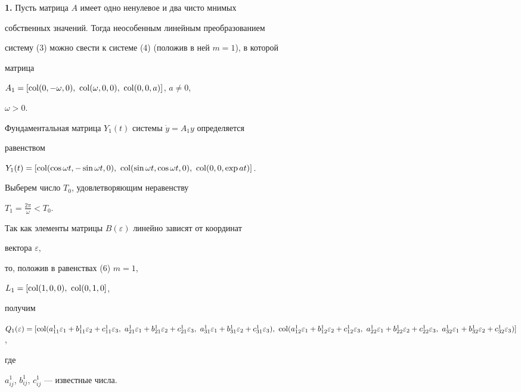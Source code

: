  


{\bf 1.} Пусть матрица $A$ имеет одно ненулевое и два чисто мнимых 


собственных значений. Тогда неособенным линейным преобразованием 


систему (3) можно свести к системе (4) (положив в ней $m=1$), в которой 


матрица 


$A_1=[\col(0,-\omega,0),\ \col(\omega,0,0),\ \col(0,0,a)]$, $a\ne 0$, 


$\omega>0$. 


Фундаментальная матрица $Y_1(t)$ системы $\Dot y=A_1y$ определяется 


равенством 


$Y_1(t)=[\col(\cos\omega t,-\sin\omega t,0),\ \col(\sin\omega t,\cos 


\omega t,0),\ \col(0,0,\exp at)]$. 


 


Выберем число $T_0$, удовлетворяющим неравенству 


$T_1=\frac{2\pi}{\omega}<T_0$. 


Так как элементы матрицы $B(\varepsilon)$ линейно зависят от координат 


вектора $\varepsilon$, 


то, положив в равенствах (6) $m=1$, 


$L_1=[\col(1,0,0),\ \col(0,1,0]$, 


получим 


$Q_1(\varepsilon)=[\col(a^1_{11}\varepsilon_1+b^1_{11}\varepsilon_2+ 


c^1_{11}\varepsilon_3,\ a^1_{21}\varepsilon_1+ 


b^1_{21}\varepsilon_2+c^1_{21}\varepsilon_3,\ a^1_{31} 


\varepsilon_1+b^1_{31}\varepsilon_2+c^1_{31}\varepsilon_3),\ 


\col(a^1_{12}\varepsilon_1+b^1_{12}\varepsilon_2+ 


c^1_{12}\varepsilon_3,\ a^1_{22}\varepsilon_1+b^1_{22}\varepsilon_2+ 


c^1_{22}\varepsilon_3,\ a^1_{32}\varepsilon_1+ 


b^1_{32}\varepsilon_2+c^1_{32}\varepsilon_3)]$, 


где


$a^1_{ij}$, $b^1_{ij}$, $c^1_{ij}$ --- известные числа. 


 


